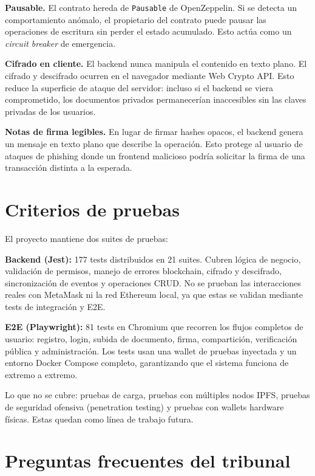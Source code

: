 \documentclass[11pt, a4paper]{article}
\begin{document}
\textbf{Pausable.} El contrato hereda de \texttt{Pausable} de OpenZeppelin. Si se detecta un comportamiento an\'omalo, el propietario del contrato puede pausar las operaciones de escritura sin perder el estado acumulado. Esto act\'ua como un \textit{circuit breaker} de emergencia.

\textbf{Cifrado en cliente.} El backend nunca manipula el contenido en texto plano. El cifrado y descifrado ocurren en el navegador mediante Web Crypto API. Esto reduce la superficie de ataque del servidor: incluso si el backend se viera comprometido, los documentos privados permanecer\'ian inaccesibles sin las claves privadas de los usuarios.

\textbf{Notas de firma legibles.} En lugar de firmar hashes opacos, el backend genera un mensaje en texto plano que describe la operaci\'on. Esto protege al usuario de ataques de phishing donde un frontend malicioso podr\'ia solicitar la firma de una transacci\'on distinta a la esperada.

\section{Criterios de pruebas}

El proyecto mantiene dos suites de pruebas:

\textbf{Backend (Jest):} 177 tests distribuidos en 21 suites. Cubren l\'ogica de negocio, validaci\'on de permisos, manejo de errores blockchain, cifrado y descifrado, sincronizaci\'on de eventos y operaciones CRUD. No se prueban las interacciones reales con MetaMask ni la red Ethereum local, ya que estas se validan mediante tests de integraci\'on y E2E.

\textbf{E2E (Playwright):} 81 tests en Chromium que recorren los flujos completos de usuario: registro, login, subida de documento, firma, compartici\'on, verificaci\'on p\'ublica y administraci\'on. Los tests usan una wallet de pruebas inyectada y un entorno Docker Compose completo, garantizando que el sistema funciona de extremo a extremo.

Lo que no se cubre: pruebas de carga, pruebas con m\'ultiples nodos IPFS, pruebas de seguridad ofensiva (penetration testing) y pruebas con wallets hardware f\'isicas. Estas quedan como l\'inea de trabajo futura.

\section{Preguntas frecuentes del tribunal}
\end{document}
